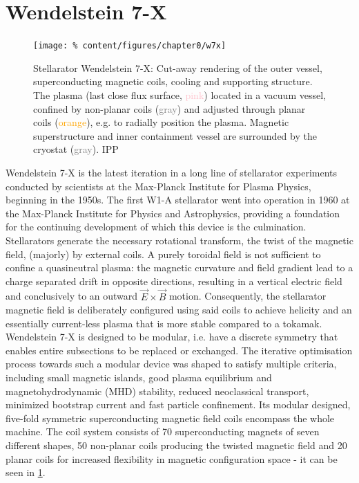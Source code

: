     \section{Wendelstein 7-X}\label{sec:w7x}%
%
        \begin{figure}%
            \centering%
            \texttt{[image: \%
                content/figures/chapter0/w7x]}%
            \caption{Stellarator Wendelstein 7-X: Cut-away rendering of the outer vessel, superconducting magnetic coils, cooling and supporting structure. The plasma (last close flux surface, \textcolor{pink}{pink}) located in a vacuum vessel, confined by non-planar coils (\textcolor{gray}{gray}) and adjusted through planar coils (\textcolor{orange}{orange}), e.g. to radially position the plasma. Magnetic superstructure and inner containment vessel are surrounded by the cryostat (\textcolor{gray}{gray}). \textcopyright IPP}\label{fig:w7x}%
        \end{figure}%
%
        Wendelstein 7-X is the latest iteration in a long line of stellarator experiments conducted by scientists at the Max-Planck Institute for Plasma Physics, beginning in the 1950s. The first W1-A stellarator went into operation in 1960 at the Max-Planck Institute for Physics and Astrophysics, providing a foundation for the continuing development of which this device is the culmination.\\%
        Stellarators generate the necessary rotational transform, the twist of the magnetic field, (majorly) by external coils. A purely toroidal field is not sufficient to confine a quasineutral plasma: the magnetic curvature and field gradient lead to a charge separated drift in opposite directions, resulting in a vertical electric field and conclusively to an outward $\vec{E}\times\vec{B}$ motion. Consequently, the stellarator magnetic field is deliberately configured using said coils to achieve helicity and an essentially current-less plasma that is more stable compared to a tokamak. Wendelstein 7-X is designed to be modular, i.e. have a discrete symmetry that enables entire subsections to be replaced or exchanged. The iterative optimisation process towards such a modular device was shaped to satisfy multiple criteria, including small magnetic islands, good plasma equilibrium and magnetohydrodynamic (MHD) stability, reduced neoclassical transport, minimized bootstrap current and fast particle confinement. Its modular designed, five-fold symmetric superconducting magnetic field coils encompass the whole machine. The coil system consists of 70 superconducting magnets of seven different shapes, 50 non-planar coils producing the twisted magnetic field and 20 planar coils for increased flexibility in magnetic configuration space - it can be seen in \cref{fig:w7x}\cite{Spitzer1958,Boozer1998,Wagner1998,Beidler1990}.\\%
